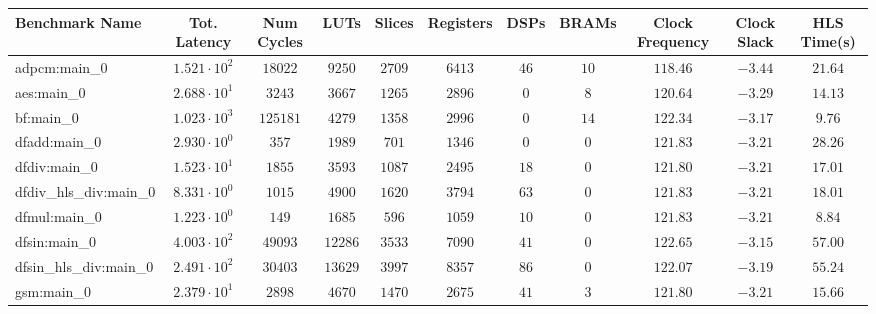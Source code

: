 \begin{tabular}{|l|c|c|c|c|c|c|c|c|c|c|}
\hline
Benchmark Name          & Tot. Latency           & Num Cycles & LUTs      & Slices    & Registers & DSPs    & BRAMs   & Clock Frequency & Clock Slack & HLS Time(s) \\
\hline
adpcm:main\_0           & $ 1.521 \cdot 10^{2} $ & $ 18022  $ & $ 9250  $ & $ 2709  $ & $ 6413  $ & $ 46  $ & $ 10  $ & $ 118.46      $ & $ -3.44   $ & $ 21.64   $ \\
aes:main\_0             & $ 2.688 \cdot 10^{1} $ & $ 3243   $ & $ 3667  $ & $ 1265  $ & $ 2896  $ & $ 0   $ & $ 8   $ & $ 120.64      $ & $ -3.29   $ & $ 14.13   $ \\
bf:main\_0              & $ 1.023 \cdot 10^{3} $ & $ 125181 $ & $ 4279  $ & $ 1358  $ & $ 2996  $ & $ 0   $ & $ 14  $ & $ 122.34      $ & $ -3.17   $ & $ 9.76    $ \\
dfadd:main\_0           & $ 2.930 \cdot 10^{0} $ & $ 357    $ & $ 1989  $ & $ 701   $ & $ 1346  $ & $ 0   $ & $ 0   $ & $ 121.83      $ & $ -3.21   $ & $ 28.26   $ \\
dfdiv:main\_0           & $ 1.523 \cdot 10^{1} $ & $ 1855   $ & $ 3593  $ & $ 1087  $ & $ 2495  $ & $ 18  $ & $ 0   $ & $ 121.80      $ & $ -3.21   $ & $ 17.01   $ \\
dfdiv\_hls\_div:main\_0 & $ 8.331 \cdot 10^{0} $ & $ 1015   $ & $ 4900  $ & $ 1620  $ & $ 3794  $ & $ 63  $ & $ 0   $ & $ 121.83      $ & $ -3.21   $ & $ 18.01   $ \\
dfmul:main\_0           & $ 1.223 \cdot 10^{0} $ & $ 149    $ & $ 1685  $ & $ 596   $ & $ 1059  $ & $ 10  $ & $ 0   $ & $ 121.83      $ & $ -3.21   $ & $ 8.84    $ \\
dfsin:main\_0           & $ 4.003 \cdot 10^{2} $ & $ 49093  $ & $ 12286 $ & $ 3533  $ & $ 7090  $ & $ 41  $ & $ 0   $ & $ 122.65      $ & $ -3.15   $ & $ 57.00   $ \\
dfsin\_hls\_div:main\_0 & $ 2.491 \cdot 10^{2} $ & $ 30403  $ & $ 13629 $ & $ 3997  $ & $ 8357  $ & $ 86  $ & $ 0   $ & $ 122.07      $ & $ -3.19   $ & $ 55.24   $ \\
gsm:main\_0             & $ 2.379 \cdot 10^{1} $ & $ 2898   $ & $ 4670  $ & $ 1470  $ & $ 2675  $ & $ 41  $ & $ 3   $ & $ 121.80      $ & $ -3.21   $ & $ 15.66   $ \\

\end{tabular}
